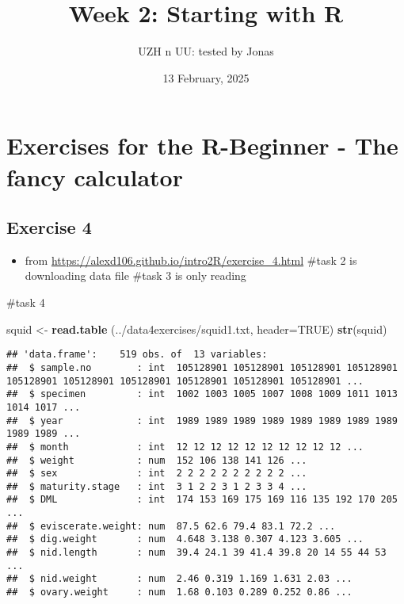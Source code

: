 \documentclass[
]{article}
\title{Week 2: Starting with R}
\author{UZH n UU: tested by Jonas}
\date{13 February, 2025}
\newenvironment{Shaded}{\begin{snugshade}}{\end{snugshade}}
\newcommand{\AttributeTok}[1]{\textcolor[rgb]{0.13,0.29,0.53}{#1}}
\newcommand{\ConstantTok}[1]{\textcolor[rgb]{0.56,0.35,0.01}{#1}}
\newcommand{\FunctionTok}[1]{\textcolor[rgb]{0.13,0.29,0.53}{\textbf{#1}}}
\newcommand{\NormalTok}[1]{#1}
\newcommand{\OtherTok}[1]{\textcolor[rgb]{0.56,0.35,0.01}{#1}}
\newcommand{\StringTok}[1]{\textcolor[rgb]{0.31,0.60,0.02}{#1}}
\providecommand{\tightlist}{%
  \setlength{\itemsep}{0pt}\setlength{\parskip}{0pt}}
\begin{document}
\maketitle

{
\setcounter{tocdepth}{2}
\tableofcontents
}
\section{Exercises for the R-Beginner - The fancy calculator}\label{exercises-for-the-r-beginner---the-fancy-calculator}

\subsection{Exercise 4}\label{exercise-4}

\begin{itemize}
\tightlist
\item
  from \url{https://alexd106.github.io/intro2R/exercise_4.html}
  \#task 2 is downloading data file
  \#task 3 is only reading
\end{itemize}

\#task 4

\begin{Shaded}
\begin{Highlighting}[]
\NormalTok{squid }\OtherTok{\textless{}{-}} \FunctionTok{read.table}\NormalTok{ (}\StringTok{\textquotesingle{}../data4exercises/squid1.txt\textquotesingle{}}\NormalTok{, }\AttributeTok{header=}\ConstantTok{TRUE}\NormalTok{)}
\FunctionTok{str}\NormalTok{(squid)}
\end{Highlighting}
\end{Shaded}

\begin{verbatim}
## 'data.frame':    519 obs. of  13 variables:
##  $ sample.no        : int  105128901 105128901 105128901 105128901 105128901 105128901 105128901 105128901 105128901 105128901 ...
##  $ specimen         : int  1002 1003 1005 1007 1008 1009 1011 1013 1014 1017 ...
##  $ year             : int  1989 1989 1989 1989 1989 1989 1989 1989 1989 1989 ...
##  $ month            : int  12 12 12 12 12 12 12 12 12 12 ...
##  $ weight           : num  152 106 138 141 126 ...
##  $ sex              : int  2 2 2 2 2 2 2 2 2 2 ...
##  $ maturity.stage   : int  3 1 2 2 3 1 2 3 3 4 ...
##  $ DML              : int  174 153 169 175 169 116 135 192 170 205 ...
##  $ eviscerate.weight: num  87.5 62.6 79.4 83.1 72.2 ...
##  $ dig.weight       : num  4.648 3.138 0.307 4.123 3.605 ...
##  $ nid.length       : num  39.4 24.1 39 41.4 39.8 20 14 55 44 53 ...
##  $ nid.weight       : num  2.46 0.319 1.169 1.631 2.03 ...
##  $ ovary.weight     : num  1.68 0.103 0.289 0.252 0.86 ...
\end{verbatim}
\end{document}
